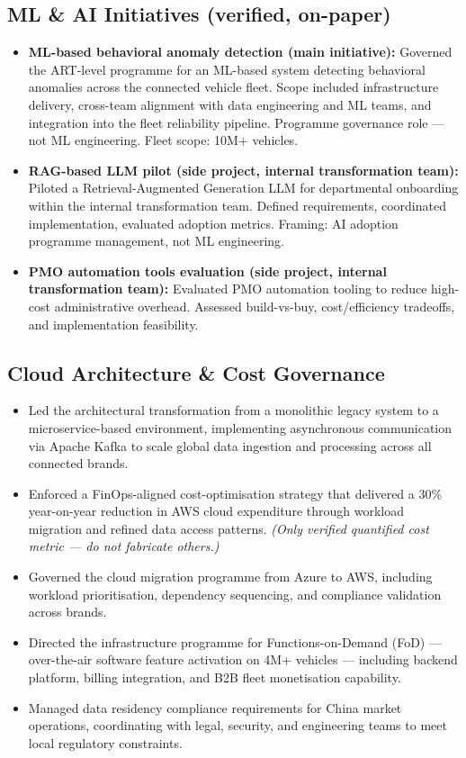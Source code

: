 \documentclass[10pt,a4paper]{article}
\begin{document}
\subsection*{ML \& AI Initiatives (verified, on-paper)}

\begin{itemize}
  \item \textbf{ML-based behavioral anomaly detection (main initiative):} Governed the ART-level
        programme for an ML-based system detecting behavioral anomalies across the connected vehicle fleet.
        Scope included infrastructure delivery, cross-team alignment with data engineering and ML teams,
        and integration into the fleet reliability pipeline. Programme governance role — not ML
        engineering. Fleet scope: 10M+ vehicles.
  \item \textbf{RAG-based LLM pilot (side project, internal transformation team):} Piloted a
        Retrieval-Augmented Generation LLM for departmental onboarding within the internal transformation
        team. Defined requirements, coordinated implementation, evaluated adoption metrics.
        Framing: AI adoption programme management, not ML engineering.
  \item \textbf{PMO automation tools evaluation (side project, internal transformation team):}
        Evaluated PMO automation tooling to reduce high-cost administrative overhead. Assessed
        build-vs-buy, cost/efficiency tradeoffs, and implementation feasibility.
\end{itemize}

\subsection*{Cloud Architecture \& Cost Governance}

\begin{itemize}
  \item Led the architectural transformation from a monolithic legacy system to a microservice-based
        environment, implementing asynchronous communication via Apache Kafka to scale global data
        ingestion and processing across all connected brands.
  \item Enforced a FinOps-aligned cost-optimisation strategy that delivered a 30\% year-on-year
        reduction in AWS cloud expenditure through workload migration and refined data access patterns.
        \textit{(Only verified quantified cost metric — do not fabricate others.)}
  \item Governed the cloud migration programme from Azure to AWS, including workload prioritisation,
        dependency sequencing, and compliance validation across brands.
  \item Directed the infrastructure programme for Functions-on-Demand (FoD) — over-the-air software
        feature activation on 4M+ vehicles — including backend platform, billing integration,
        and B2B fleet monetisation capability.
  \item Managed data residency compliance requirements for China market operations, coordinating
        with legal, security, and engineering teams to meet local regulatory constraints.
\end{itemize}
\end{document}
